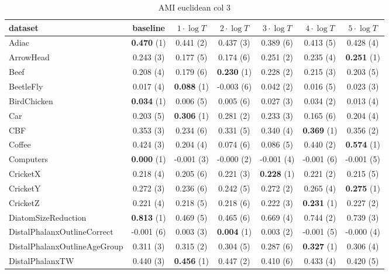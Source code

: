     \begin{table}[ht]
    \caption{AMI euclidean col 3} 
    \begin{adjustbox}{width=\textwidth}
    \begin{tabular}{lcccccc}
    \hline
    dataset & baseline & \textbf{$1\cdot \log{T}$} & \textbf{$2\cdot \log{T}$} & \textbf{$3\cdot \log{T}$} & \textbf{$4\cdot \log{T}$} & \textbf{$5\cdot \log{T}$} \\ \hline
    Adiac & \textbf{0.470} (1) & 0.441 (2) & 0.437 (3) & 0.389 (6) & 0.413 (5) & 0.428 (4) \\
    ArrowHead & 0.243 (3) & 0.177 (5) & 0.174 (6) & 0.251 (2) & 0.235 (4) & \textbf{0.251} (1) \\
    Beef & 0.208 (4) & 0.179 (6) & \textbf{0.230} (1) & 0.228 (2) & 0.215 (3) & 0.203 (5) \\
    BeetleFly & 0.017 (4) & \textbf{0.088} (1) & -0.003 (6) & 0.042 (2) & 0.016 (5) & 0.023 (3) \\
    BirdChicken & \textbf{0.034} (1) & 0.006 (5) & 0.005 (6) & 0.027 (3) & 0.034 (2) & 0.013 (4) \\
    Car & 0.203 (5) & \textbf{0.306} (1) & 0.281 (2) & 0.233 (3) & 0.165 (6) & 0.204 (4) \\
    CBF & 0.353 (3) & 0.234 (6) & 0.331 (5) & 0.340 (4) & \textbf{0.369} (1) & 0.356 (2) \\
    Coffee & 0.424 (3) & 0.204 (4) & 0.074 (6) & 0.086 (5) & 0.440 (2) & \textbf{0.574} (1) \\
    Computers & \textbf{0.000} (1) & -0.001 (3) & -0.000 (2) & -0.001 (4) & -0.001 (6) & -0.001 (5) \\
    CricketX & 0.218 (4) & 0.205 (6) & 0.221 (3) & \textbf{0.228} (1) & 0.221 (2) & 0.215 (5) \\
    CricketY & 0.272 (3) & 0.236 (6) & 0.242 (5) & 0.272 (2) & 0.265 (4) & \textbf{0.275} (1) \\
    CricketZ & 0.221 (4) & 0.218 (5) & 0.218 (6) & 0.222 (3) & \textbf{0.231} (1) & 0.227 (2) \\
    DiatomSizeReduction & \textbf{0.813} (1) & 0.469 (5) & 0.465 (6) & 0.669 (4) & 0.744 (2) & 0.739 (3) \\
    DistalPhalanxOutlineCorrect & -0.001 (6) & 0.003 (3) & \textbf{0.004} (1) & 0.003 (2) & -0.001 (5) & -0.000 (4) \\
    DistalPhalanxOutlineAgeGroup & 0.311 (3) & 0.315 (2) & 0.304 (5) & 0.287 (6) & \textbf{0.327} (1) & 0.306 (4) \\
    DistalPhalanxTW & 0.440 (3) & \textbf{0.456} (1) & 0.447 (2) & 0.410 (6) & 0.433 (4) & 0.420 (5) \\

\end{tabular}
\end{adjustbox}
\end{table}
